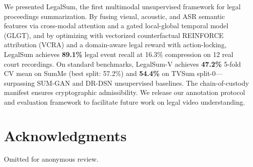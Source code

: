 \documentclass[letterpaper]{article} %
\begin{document}
We presented LegalSum, the first multimodal unsupervised framework for legal proceedings summarization. By fusing visual, acoustic, and ASR semantic features via cross-modal attention and a gated local-global temporal model (GLGT), and by optimizing with vectorized counterfactual REINFORCE attribution (VCRA) and a domain-aware legal reward with action-locking, LegalSum achieves \textbf{89.1\%} legal event recall at 16.3\% compression on 12 real court recordings. On standard benchmarks, LegalSum-V achieves \textbf{47.2\%} 5-fold CV mean on SumMe (best split: 57.2\%) and \textbf{54.4\%} on TVSum split-0---surpassing SUM-GAN and DR-DSN unsupervised baselines. The chain-of-custody manifest ensures cryptographic admissibility. We release our annotation protocol and evaluation framework to facilitate future work on legal video understanding.

\section*{Acknowledgments}
Omitted for anonymous review.


\end{document}
